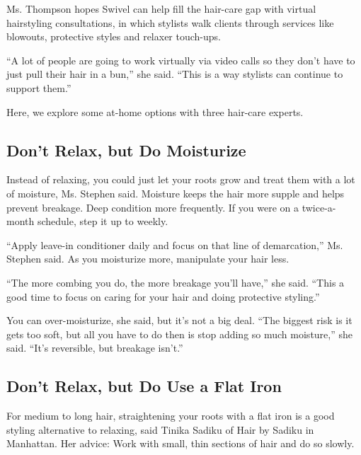 Ms. Thompson hopes Swivel can help fill the hair-care gap with virtual
hairstyling consultations, in which stylists walk clients through
services like blowouts, protective styles and relaxer touch-ups.

``A lot of people are going to work virtually via video calls so they
don't have to just pull their hair in a bun,'' she said. ``This is a way
stylists can continue to support them.''

Here, we explore some at-home options with three hair-care experts.

\hypertarget{dont-relax-but-do-moisturize}{%
\subsection{Don't Relax, but Do
Moisturize}\label{dont-relax-but-do-moisturize}}

Instead of relaxing, you could just let your roots grow and treat them
with a lot of moisture, Ms. Stephen said. Moisture keeps the hair more
supple and helps prevent breakage. Deep condition more frequently. If
you were on a twice-a-month schedule, step it up to weekly.

``Apply leave-in conditioner daily and focus on that line of
demarcation,'' Ms. Stephen said. As you moisturize more, manipulate your
hair less.

``The more combing you do, the more breakage you'll have,'' she said.
``This a good time to focus on caring for your hair and doing protective
styling.''

You can over-moisturize, she said, but it's not a big deal. ``The
biggest risk is it gets too soft, but all you have to do then is stop
adding so much moisture,'' she said. ``It's reversible, but breakage
isn't.''

\hypertarget{dont-relax-but-do-use-a-flat-iron}{%
\subsection{Don't Relax, but Do Use a Flat
Iron}\label{dont-relax-but-do-use-a-flat-iron}}

For medium to long hair, straightening your roots with a flat iron is a
good styling alternative to relaxing, said Tinika Sadiku of Hair by
Sadiku in Manhattan. Her advice: Work with small, thin sections of hair
and do so slowly.

\href{https://www.nytimes3xbfgragh.onion/news-event/coronavirus?action=click\&pgtype=Article\&state=default\&region=MAIN_CONTENT_3\&context=storylines_faq}{}

